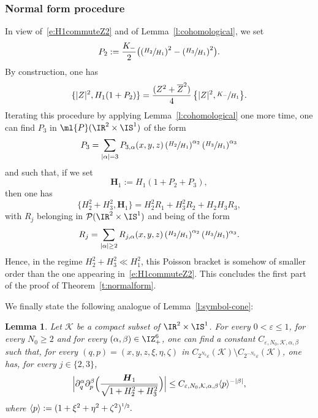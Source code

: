 \documentclass[10pt]{amsart}
\theoremstyle{plain}
\newtheorem{lemm}[theo]{Lemma}
\theoremstyle{definition}
\theoremstyle{remark}
\begin{document}
\subsubsection{Normal form procedure}
In view of~\eqref{e:H1commuteZ2} and of Lemma~\ref{l:cohomological}, we set
\[
P_2:=\frac{K_-}{2}\bigl(\left(\sfrac{H_2}{H_1}\right)^2-\left(\sfrac{H_3}{H_1}\right)^2\bigr).
\]
By construction, one has
\[
\{|Z|^2,H_1(1 + P_2)\}=\frac{(Z^2+\overline{Z}^2)}{4}\,\bigl\{|Z|^2,\sfrac{K_-}{H_1}\bigr\}.
\]
Iterating this procedure by applying Lemma~\ref{l:cohomological} one more time, one can find $P_3$ in $\ml{P}(\IR^2\times\IS^1)$ of the form
\[
P_3=\sum_{|\alpha|=3}P_{3,\alpha}(x,y,z)\left(\sfrac{H_2}{H_1}\right)^{\alpha_2}\left(\sfrac{H_3}{H_1}\right)^{\alpha_3}
\]
and such that, if we set
\begin{equation}\label{e:normalform-H1}
\boldsymbol{H}_1:=H_1\left(1+P_2 +P_3\right),
\end{equation}
then one has
\begin{equation}\label{e:H1commuteZ2-normalform}
\{H_2^2+H_3^2,\boldsymbol{H}_1\}=H_2^2 R_1+H_3^{2} R_2+H_2H_3 R_3,
\end{equation}
with $R_j$ belonging in $\mathcal{P}(\IR^2\times\IS^1)$ and being of the form
\[
R_j=\sum_{|\alpha|\geq 2}R_{j,\alpha}(x,y,z)\left(\sfrac{H_2}{H_1}\right)^{\alpha_2}(\sfrac{H_3}{H_1})^{\alpha_3}.
\]
Hence, in the regime $H_2^2+H_3^2\ll H_1^2$, this Poisson bracket is somehow of smaller order than the one appearing in~\eqref{e:H1commuteZ2}. This concludes the first part of the proof of Theorem~\ref{t:normalform}.

We finally state the following analogue of Lemma~\ref{l:symbol-cone}:

\begin{lemm}\label{l:symbol-cone-normalform} Let $\mathcal{K
}$ be a compact subset of $\IR^2\times\IS^1$. For every $0<\varepsilon\leq 1$, for every $N_0\geq 2$ and for every $(\alpha,\beta)\in\IZ_+^6$, one can find a constant $C_{\varepsilon, N_0, \mathcal{K}, \alpha,\beta}$ such that, for every $(q,p)=(x,y,z,\xi,\eta,\zeta)$ in $C_{2^{N_0}\varepsilon}(\mathcal{K})\setminus C_{2^{-N_0}\varepsilon}(\mathcal{K})$, one has, for every $j\in\{2,3\}$,
\[
\Bigl|\partial^\alpha_{q}\partial_{p}^\beta \Bigl(\frac{\boldsymbol{H}_1}{\sqrt{1+H_2^2+H_3^2}}\Bigr)\Bigr|\leq C_{\varepsilon, N_0, \mathcal{K},\alpha,\beta}\langle p\rangle^{-|\beta|},
\]
where $\langle p\rangle:=(1+\xi^2+\eta^2+\zeta^2)^{\sfrac{1}{2}}.$
\end{lemm}
\end{document}
